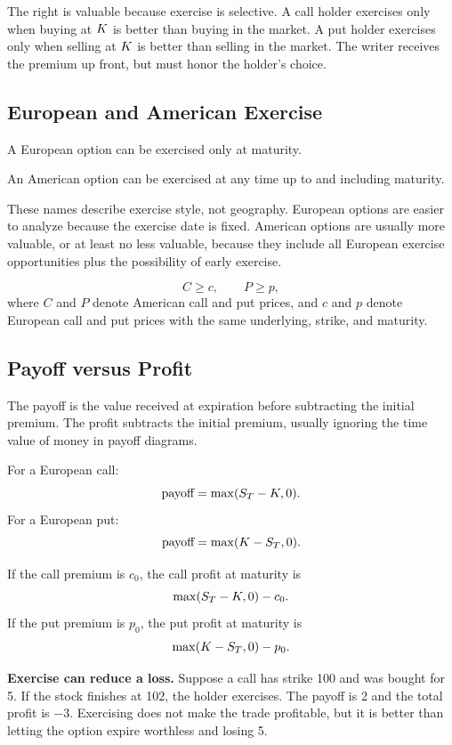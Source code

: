 The right is valuable because exercise is selective. A call holder exercises only
when buying at $K$ is better than buying in the market. A put holder exercises
only when selling at $K$ is better than selling in the market. The writer
receives the premium up front, but must honor the holder's choice.

\subsection{European and American Exercise}

\begin{defN}
A European option can be exercised only at maturity.
\end{defN}

\begin{defN}
An American option can be exercised at any time up to and including maturity.
\end{defN}

These names describe exercise style, not geography. European options are easier
to analyze because the exercise date is fixed. American options are usually more
valuable, or at least no less valuable, because they include all European
exercise opportunities plus the possibility of early exercise.

\[
    C \geq c,
    \qquad
    P \geq p,
\]
where $C$ and $P$ denote American call and put prices, and $c$ and $p$ denote
European call and put prices with the same underlying, strike, and maturity.

\subsection{Payoff versus Profit}

The payoff is the value received at expiration before subtracting the initial
premium. The profit subtracts the initial premium, usually ignoring the time
value of money in payoff diagrams.

For a European call:
\[
    \text{payoff}=\max(S_T-K,0).
\]
For a European put:
\[
    \text{payoff}=\max(K-S_T,0).
\]

If the call premium is $c_0$, the call profit at maturity is
\[
    \max(S_T-K,0)-c_0.
\]
If the put premium is $p_0$, the put profit at maturity is
\[
    \max(K-S_T,0)-p_0.
\]

\begin{boxD}
\textbf{Exercise can reduce a loss.} Suppose a call has strike 100 and was
bought for 5. If the stock finishes at 102, the holder exercises. The payoff is
2 and the total profit is $-3$. Exercising does not make the trade profitable,
but it is better than letting the option expire worthless and losing 5.
\end{boxD}

